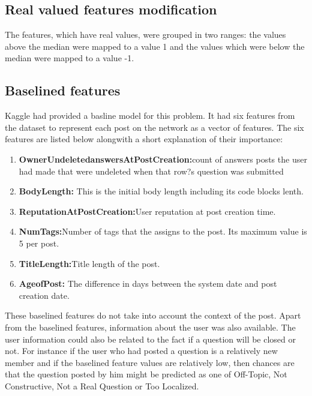 \documentclass[letterpaper,twocolumn,11pt]{article}
\begin{document}
\subsection{Real valued features modification}
The features, which have real values, were grouped in two ranges: the values above the median were mapped to a value 1 and the values which were below the median were mapped to a value -1.

\subsection{Baselined features}
Kaggle had provided a basline model for this problem. It had six features from the dataset to represent each post on the network as a vector of features. The six features are listed below alongwith a short explanation of their importance:
\begin{enumerate}
	\item \textbf{OwnerUndeletedanswersAtPostCreation:}count of answers posts the user had made that were undeleted when that row?s question was submitted
	\item \textbf{BodyLength:} This is the initial body length including
its code blocks lenth.
	\item \textbf{ReputationAtPostCreation:}User reputation at  post creation time.
	\item \textbf{NumTags:}Number of tags that the assigns to the post. Its maximum value is 5 per post.
	\item \textbf{TitleLength:}Title length of the post.
    \item \textbf{AgeofPost:} The difference in days between the system date and post creation date.
\end{enumerate}

These baselined features do not take into account the context of the post. Apart from the baselined features, information about the user was also available. The user information could also be related to the fact if a question will be closed or not. For instance if the user who had posted a question is a relatively new member and if the baselined feature values are relatively low, then chances are that the question posted by him might be predicted as one of Off-Topic, Not Constructive, Not a Real Question or Too Localized.
\end{document}
